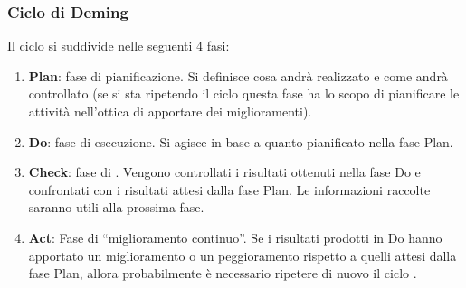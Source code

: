 \subsubsection{Ciclo di Deming} \label{AppPDCA}
Il ciclo  si suddivide nelle seguenti 4 fasi:
\begin{enumerate}
\item \textbf{Plan}: fase di pianificazione. Si definisce cosa andrà realizzato e come andrà controllato (se si sta ripetendo il ciclo questa fase ha lo scopo di pianificare le attività nell'ottica di apportare dei miglioramenti).
\item \textbf{Do}: fase di esecuzione. Si agisce in base a quanto pianificato nella fase Plan.
\item \textbf{Check}: fase di . Vengono controllati i risultati ottenuti nella fase Do e confrontati con i risultati attesi dalla fase Plan. Le informazioni raccolte saranno utili alla prossima fase.
\item \textbf{Act}: Fase di “miglioramento continuo”. Se i risultati prodotti in Do hanno apportato un miglioramento o un peggioramento rispetto a quelli attesi dalla fase Plan, allora probabilmente è necessario ripetere di nuovo il ciclo .
\end{enumerate}
